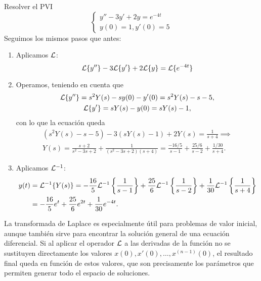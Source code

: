 \documentclass[../main.tex]{subfiles}
\begin{document}
\begin{example}
  Resolver el PVI
  \[
    \begin{cases}
      y'' - 3y' + 2y = e^{-4t} \\
      y(0) = 1, y'(0) = 5
    \end{cases}
  \]
  Seguimos los mismos pasos que antes:
  \begin{enumerate}[1)]
  \item Aplicamos \(\mathcal{L}\):
    \[\mathcal{L}\{y''\} - 3\mathcal{L}\{y'\} + 2\mathcal{L}\{y\} = \mathcal{L}\{e^{-4t}\}\]
  \item Operamos, teniendo en cuenta que
    \begin{gather*}
      \mathcal{L}\{y''\} = s^2Y(s) - sy(0) - y'(0) = s^2Y(s) - s - 5, \\
      \mathcal{L}\{y'\} = sY(s) - y(0) = sY(s) - 1,
    \end{gather*}
    con lo que la ecuación queda
    \begin{gather*}
      \left(s^2Y(s) - s - 5\right) - 3\left(sY(s) - 1\right) + 2Y(s) =
      \frac{1}{s+4} \implies \\
      Y(s) = \frac{s+2}{s^2-3s+2} + \frac{1}{(s^2-3s+2)(s+4)} =
      \frac{-16/5}{s-1} + \frac{25/6}{s-2} + \frac{1/30}{s+4}.
    \end{gather*}
  \item Aplicamos \(\mathcal{L}^{-1}\):
    \begin{align*}
      y(t) &= \mathcal{L}^{-1}\{Y(s)\} = -\frac{16}{5}\mathcal{L}^{-1}\left\{\frac{1}{s-1}\right\}
      +\frac{25}{6}\mathcal{L}^{-1}\left\{\frac{1}{s-2}\right\}
      +\frac{1}{30}\mathcal{L}^{-1}\left\{\frac{1}{s+4}\right\} \\
      &= -\frac{16}{5}e^t + \frac{25}{6}e^{2t} + \frac{1}{30}e^{-4t}.
    \end{align*}
  \end{enumerate}
\end{example}

\begin{remark}
  La transformada de Laplace es especialmente útil para problemas de valor
  inicial, aunque también sirve para encontrar la solución general de una
  ecuación diferencial. Si al aplicar el operador \(\mathcal{L}\) a las derivadas de la
  función no se sustituyen directamente los valores
  \(x(0), x'(0), \dots, x^{(n-1)}(0)\), el resultado final queda en función de
  estos valores, que son precisamente los parámetros que permiten generar todo
  el espacio de soluciones.
\end{remark}
\end{document}
